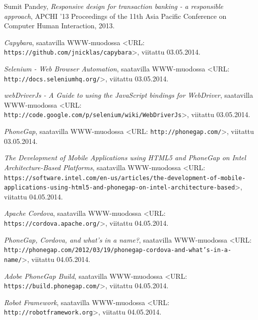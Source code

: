 \documentclass[finnish,nonumbib,nocopyright]{gradu2}
\begin{document}
\begin{thebibliography}{9}
Sumit Pandey, \textit{Responsive design for transaction banking - a responsible approach},
APCHI '13 Proceedings of the 11th Asia Pacific Conference on Computer Human Interaction, 2013.

\textit{Capybara}, saatavilla WWW-muodossa
<URL: \texttt{https://github.com/jnicklas/capybara}>, viitattu 03.05.2014.

\textit{Selenium - Web Browser Automation}, saatavilla WWW-muodossa
<URL: \texttt{http://docs.seleniumhq.org/}>, viitattu 03.05.2014.

\textit{webDriverJs - A Guide to using the JavaScript bindings for WebDriver}, saatavilla WWW-muodossa
<URL: \texttt{http://code.google.com/p/selenium/wiki/WebDriverJs}>, viitattu 03.05.2014.

\textit{PhoneGap}, saatavilla WWW-muodossa
<URL: \texttt{http://phonegap.com/}>, viitattu 03.05.2014.

\textit{The Development of Mobile Applications using HTML5 and PhoneGap on Intel Architecture-Based Platforms}, saatavilla WWW-muodossa
<URL: \texttt{https://software.intel.com/en-us/articles/the-development-of-mobile-applications-using-html5-and-phonegap-on-intel-architecture-based}>, viitattu 04.05.2014.
 
\textit{Apache Cordova}, saatavilla WWW-muodossa
<URL: \texttt{https://cordova.apache.org/}>, viitattu 04.05.2014.
 
\textit{PhoneGap, Cordova, and what’s in a name?}, saatavilla WWW-muodossa
<URL: \texttt{http://phonegap.com/2012/03/19/phonegap-cordova-and-what’s-in-a-name/}>, viitattu 04.05.2014.
 
\textit{Adobe PhoneGap Build}, saatavilla WWW-muodossa
<URL: \texttt{https://build.phonegap.com/}>, viitattu 04.05.2014.

\textit{Robot Framework}, saatavilla WWW-muodossa
<URL: \texttt{http://robotframework.org}>, viitattu 04.05.2014.

\end{thebibliography}
\end{document}
